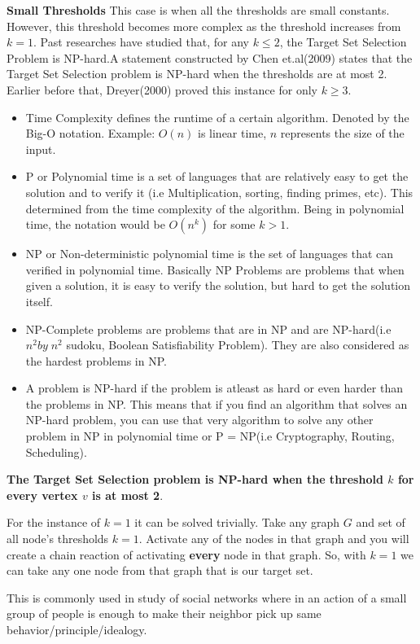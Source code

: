 \textbf{Small Thresholds} This case is when all the thresholds are small constants. However, this threshold becomes more complex as the threshold increases from $k=1$. Past researches have studied that, for any $k \leq 2$, the Target Set Selection Problem is NP-hard.A statement constructed by Chen et.al(2009) states that the Target Set Selection problem is NP-hard when the thresholds are at most 2. Earlier before that, Dreyer(2000) proved this instance for only $k \geq 3$.\cite{dreyer} \cite{NPhardness} 
\begin{itemize}
	\item Time Complexity defines the runtime of a certain algorithm. Denoted by the Big-O notation. Example: $O(n)$ is linear time, $n$ represents the size of the input.
	\item P or Polynomial time is a set of languages that are relatively easy to get the solution and to verify it (i.e Multiplication, sorting, finding primes, etc). This determined from the time complexity of the algorithm. Being in polynomial time, the notation would be $O(n^k)$ for some $k>1$.
	\item NP or Non-deterministic polynomial time is the set of languages that can verified in polynomial time. Basically NP Problems are problems that when given a solution, it is easy to verify the solution, but hard to get the solution itself.
	\item NP-Complete problems are problems that are in NP and are NP-hard(i.e $n^{2}by\; n^{2}$ sudoku, Boolean Satisfiability Problem). They are also considered as the hardest problems in NP.
	\item A problem is NP-hard if the problem is atleast as hard or even harder than the problems in NP. This means that if you find an algorithm that solves an NP-hard problem, you can use that very algorithm to solve any other problem in NP in polynomial time or P = NP(i.e Cryptography, Routing, Scheduling).  
\end{itemize} 
\textbf{The Target Set Selection problem is NP-hard when the threshold $k$ for every vertex $v$ is at most 2}. \cite{chen,dreyer}

For the instance of $k=1$ it can be solved trivially. Take any graph $G$ and set of all node's thresholds $k=1$. Activate any of the nodes in that graph and you will create a chain reaction of activating \textbf{every} node in that graph. So, with $k=1$ we can take any one node from that graph that is our target set.\cite{chen}

This is commonly used in study of social networks where in an action of a small group of people is enough to make their neighbor pick up same behavior/principle/idealogy.

